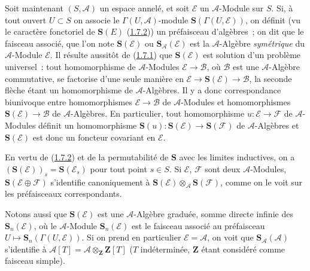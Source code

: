 \begin{env}[1.7.4]
\label{II.1.7.4-fr}
Soit maintenant $(S,\mathcal{A})$ un espace annelé, et soit $\mathcal{E}$ un
$\mathcal{A}$-Module sur $S$. Si, à tout ouvert $U\subset S$ on associe le
$\Gamma(U,\mathcal{A})$-module
$\mathbf{S}(\Gamma(U,\mathcal{E}))$, on définit (vu le caractère fonctoriel
de $\mathbf{S}(E)$ (\hyperref[II.1.7.2-fr]{1.7.2})) un préfaisceau d'algèbres~;
on dit que le faisceau associé, que l'on note $\mathbf{S}(\mathcal{E})$ ou
$\mathbf{S}_{\mathcal{A}}(\mathcal{E})$ est la $\mathcal{A}$-Algèbre
\emph{symétrique} du $\mathcal{A}$-Module $\mathcal{E}$. Il résulte aussitôt
de (\hyperref[II.1.7.1-fr]{1.7.1}) que $\mathbf{S}(\mathcal{E})$ est solution
d'un problème universel~: tout homomorphisme de $\mathcal{A}$-Modules
$\mathcal{E}\to\mathcal{B}$, où $\mathcal{B}$ est une $\mathcal{A}$-Algèbre commutative,
se factorise d'une seule manière en
$\mathcal{E}\to\mathbf{S}(\mathcal{E})\to\mathcal{B}$, la seconde flèche étant
un homomorphisme de $\mathcal{A}$-Algèbres. Il y a donc correspondance
biunivoque entre homomorphismes $\mathcal{E}\to\mathcal{B}$ de
$\mathcal{A}$-Modules et homomorphismes
$\mathbf{S}(\mathcal{E})\to\mathcal{B}$ de $\mathcal{A}$-Algèbres. En
particulier, tout homomorphisme $u:\mathcal{E}\to\mathcal{F}$ de
$\mathcal{A}$-Modules définit un homomorphisme
$\mathbf{S}(u):\mathbf{S}(\mathcal{E})\to\mathbf{S}(\mathcal{F})$ de
$\mathcal{A}$-Algèbres et $\mathbf{S}(\mathcal{E})$ est donc un foncteur
covariant en $\mathcal{E}$.

En vertu de (\hyperref[II.1.7.2-fr]{1.7.2}) et de la permutabilité de
$\mathbf{S}$ avec les limites inductives, on a
$(\mathbf{S}(\mathcal{E}))_s=\mathbf{S}(\mathcal{E}_s)$ pour tout point
$s\in S$. Si $\mathcal{E}$, $\mathcal{F}$ sont deux $\mathcal{A}$-Modules,
$\mathbf{S}(\mathcal{E}\oplus\mathcal{F})$ s'identifie canoniquement à
$\mathbf{S}(\mathcal{E})\otimes_{\mathcal{A}}\mathbf{S}(\mathcal{F})$,
comme on le voit sur les préfaisceaux correspondants.

Notons aussi que $\mathbf{S}(\mathcal{E})$ est une $\mathcal{A}$-Algèbre
graduée, somme directe infinie des $\mathbf{S}_n(\mathcal{E})$, où le
$\mathcal{A}$-Module $\mathbf{S}_n(\mathcal{E})$ est le faisceau associé au
préfaisceau $U\mapsto\mathbf{S}_n(\Gamma(U,\mathcal{E}))$. Si on prend en
particulier $\mathcal{E}=\mathcal{A}$, on voit que
$\mathbf{S}_{\mathcal{A}}(\mathcal{A})$ s'identifie à
$\mathcal{A}[T]=\mathcal{A}\otimes_{\mathbf{Z}}\mathbf{Z}[T]$
($T$ indéterminée, $\mathbf{Z}$ étant considéré comme faisceau simple).
\end{env}

